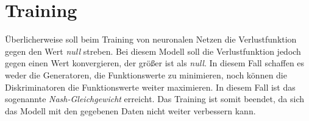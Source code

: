 


\section{Training}
Überlicherweise soll beim Training von neuronalen Netzen die Verlustfunktion gegen den Wert \emph{null} streben. Bei diesem Modell soll die Verlustfunktion jedoch gegen einen Wert konvergieren, der größer ist als \emph{null}. In diesem Fall schaffen es weder die Generatoren, die Funktionswerte zu minimieren, noch können die Diskriminatoren die Funktionswerte weiter maximieren. In diesem Fall ist das sogenannte \emph{Nash-Gleichgewicht} erreicht. Das Training ist somit beendet, da sich das Modell mit den gegebenen Daten nicht weiter verbessern kann.